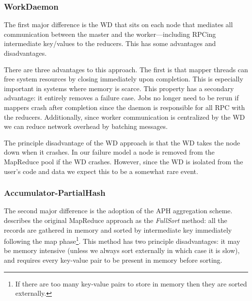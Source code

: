 \documentclass[10pt,letter,final,article,twocolumn]{article} %
\begin{document}
\subsubsection{WorkDaemon}

The first major difference is the WD that sits on each node that mediates all communication between the master and the worker---including RPCing intermediate key/values to the reducers. This has some advantages and disadvantages.

There are three advantages to this approach. The first is that mapper threads can free system resources by closing immediately upon completion. This is especially important in systems where memory is scarce. This property has a secondary advantage: it entirely removes a failure case. Jobs no longer need to be rerun if mappers crash after completion since the daemon is responsible for all RPC with the reducers. Additionally, since worker communication is centralized by the WD we can reduce network overhead by batching messages.

The principle disadvantage of the WD approach is that the WD takes the node down when it crashes. In our failure model a node is removed from the MapReduce pool if the WD crashes. However, since the WD is isolated from the user's code and data we expect this to be a somewhat rare event.

\subsubsection{Accumulator-PartialHash}

The second major difference is the adoption of the APH aggregation scheme. \citet{yu2009distributed} describes the original MapReduce approach as the \emph{FullSort} method: all the records are gathered in memory and sorted by intermediate key immediately following the map phase\footnote{If there are too many key-value pairs to store in memory then they are sorted externally.}. This method has two principle disadvantages: it may be memory intensive (unless we always sort externally in which case it is slow), and requires every key-value pair to be present in memory before sorting. 
\end{document}
